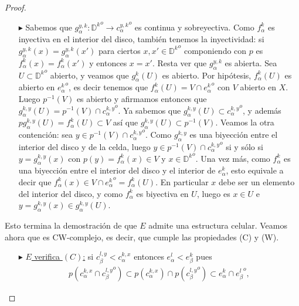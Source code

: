 \documentclass[11pt]{article}
\newcommand{\D}{\mathbb{D}}
\newcommand{\tint}[1]{#1^o}%
\begin{document}
\begin{proof}
\begin{itemize}
\begin{itemize}
\item[$\blacktriangleright$] Sabemos que $g_\alpha^{y,k} : \tint{{\D^k}} \to \tint{{c_\alpha^{y,k}}}$ es continua y sobreyectiva. Como $f_\alpha^k$ es inyectiva en el interior del disco, tambi\'en tenemos la inyectividad: si $g_\alpha^{y,k}(x) = g_\alpha^{y,k}(x')$ para ciertos $x,x' \in \tint{{\D^k}}$ componiendo con $p$ es $f_\alpha^k(x) = f_\alpha^k(x')$ y entonces $x = x'$. Resta ver que $g_\alpha^{y,k}$ es abierta. Sea $U \subset \tint{{\D^k}}$ abierto, y veamos que $g_\alpha^k(U)$ es abierto. Por hip\'otesis, $f_\alpha^k(U)$ es abierto en $\tint{{e_\alpha^k}}$, es decir tenemos que $f_\alpha^k(U) = V \cap \tint{{e_\alpha^k}}$ con $V$ abierto en $X$. Luego $p^{-1}(V)$ es abierto y afirmamos entonces que $g_\alpha^{k,y}(U) = p^{-1}(V) \cap \tint{{c_\alpha^{k,y}}}$. Ya sabemos que $g_\alpha^{k,y}(U) \subset \tint{{c_\alpha^{k,y}}}$, y adem\'as $pg_\alpha^{k,y}(U) = f_\alpha^k(U) \subset V$ as\'i que $g_\alpha^{k,y}(U) \subset p^{-1}(V)$. Veamos la otra contenci\'on: sea $y \in p^{-1}(V) \cap \tint{{c_\alpha^{k,y}}}$. Como $g_\alpha^{k,y}$ es una biyecci\'on entre el interior del disco y de la celda, luego $y \in p^{-1}(V) \cap \tint{{c_\alpha^{k,y}}}$ si y s\'olo si $y = g_\alpha^{k,y}(x)$ con $p(y) = f_\alpha^k(x) \in V$ y $x \in \tint{{\D^k}}$. Una vez m\'as, como $f_\alpha^k$ es una biyecci\'on entre el interior del disco y el interior de $e_\alpha^k$, esto equivale a decir que $f_\alpha^k(x) \in V \cap \tint{{e_\alpha^k}} = f_\alpha^k(U)$. En particular $x$ debe ser un elemento del interior del disco, y como $f_\alpha^k$ es biyectiva en $U$, luego es $x \in U$ e $y = g_\alpha^{k,y}(x) \in g_\alpha^{k,y}(U)$. 
\end{itemize}
\end{itemize}
Esto termina la demostraci\'on de que $E$ admite una estructura celular. Veamos ahora que es CW-complejo, es decir, que cumple las propiedades (C) y (W).
\begin{itemize}
\item[$\blacktriangleright$] \underline{$E$ verifica $(C)$:} si $c_\beta^{l,y} < c_\alpha^{k,x}$ entonces $e_\alpha^l < e_\beta^k$ pues
\begin{align*}
p({c_\alpha^{k,x}} \cap \tint{{c_\beta^{l,y}}}) \subset p(c_\alpha^{k,x}) \cap p(\tint{{c_\beta^{l,y}}}) \subset e_\alpha^k \cap \tint{{e_\beta^l}},
\end{align*}

\end{itemize}
\end{proof}
\end{document}
